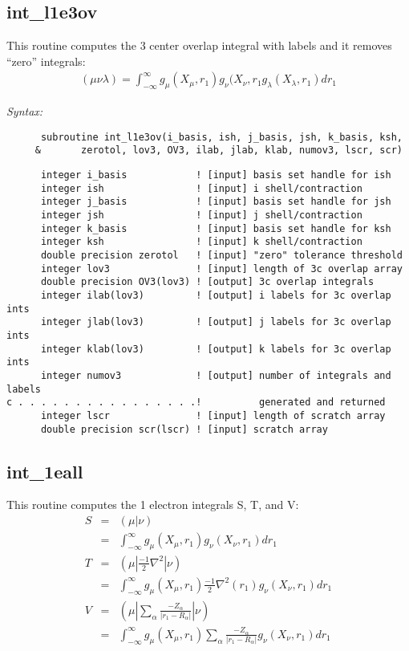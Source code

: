\subsection{int\_l1e3ov} 
This routine computes the 3 center overlap integral  
with labels and it removes ``zero'' integrals: 
\begin{eqnarray*} 
({\mu}{\nu}{\lambda}) = \int_{-\infty}^{\infty} g_{\mu}(X_{\mu},r_{1})g_{\nu}(X_{\nu},r_{1}g_{\lambda}(X_{\lambda},r_{1})dr_
{1} 
\end{eqnarray*} 
 
{\it Syntax:} 
\begin{verbatim} 
      subroutine int_l1e3ov(i_basis, ish, j_basis, jsh, k_basis, ksh, 
     &       zerotol, lov3, OV3, ilab, jlab, klab, numov3, lscr, scr) 
\end{verbatim} 
\begin{verbatim} 
      integer i_basis            ! [input] basis set handle for ish 
      integer ish                ! [input] i shell/contraction 
      integer j_basis            ! [input] basis set handle for jsh 
      integer jsh                ! [input] j shell/contraction 
      integer k_basis            ! [input] basis set handle for ksh 
      integer ksh                ! [input] k shell/contraction 
      double precision zerotol   ! [input] "zero" tolerance threshold 
      integer lov3               ! [input] length of 3c overlap array 
      double precision OV3(lov3) ! [output] 3c overlap integrals 
      integer ilab(lov3)         ! [output] i labels for 3c overlap ints 
      integer jlab(lov3)         ! [output] j labels for 3c overlap ints 
      integer klab(lov3)         ! [output] k labels for 3c overlap ints 
      integer numov3             ! [output] number of integrals and labels  
c . . . . . . . . . . . . . . . .!          generated and returned 
      integer lscr               ! [input] length of scratch array 
      double precision scr(lscr) ! [input] scratch array 
\end{verbatim} 
 
\subsection{int\_1eall}  
This routine computes the 1 electron integrals S, T, and V: 
\begin{eqnarray*}  
S & = & ({\mu}|{\nu}) \\ 
  & = & \int_{{-}\infty}^{\infty} g_{\mu}(X_{\mu},r_{1})g_{\nu}(X_{\nu},r_{1})dr_{1} \\ 
T & = & ({\mu}|\frac{-1}{2}{\nabla^{2}}|{\nu}) \\ 
  & = & \int_{-\infty}^{\infty} g_{\mu}(X_{\mu},r_{1})\frac{-1}{2}{\nabla^{2}}(r_{1})g_{\nu}(X_{\nu},r_{1})dr_{1} \\ 
V & = & ({\mu}|\sum_{\alpha}\frac{-Z_{\alpha}}{|r_{1}-R_{\alpha}|}|{\nu}) \\ 
  & = & \int_{-\infty}^{\infty}g_{\mu}(X_{\mu},r_{1})\sum_{\alpha}\frac{-Z_{\alpha}} 
{|r_{1}-R_{\alpha}|}g_{\nu}(X_{\nu},r_{1})dr_{1} 
\end{eqnarray*}  
 
